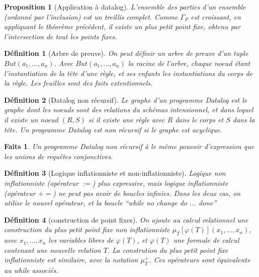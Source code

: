 \documentclass[landscape]{article}
\newcommand{\1}{\mathbbm{1}}
\newcommand{\0}{\mathbbm{0}}
\renewcommand{\phi}{\varphi}
\newtheorem{prop}{Proposition}
\newtheorem{defi}{Définition}
\newtheorem{fact}{Faits}
\begin{document}
\begin{multicols}{2}
    \begin{prop}[Application à datalog]
      L'ensemble des parties d'un ensemble (ordonné par l'inclusion) est un
      treillis complet. Comme $\Gamma_P$ est croissant, en appliquant le
      théorème précédent, il existe un plus petit point fixe, obtenu par
      l'intersection de tout les points fixes.
    \end{prop}

    \begin{defi}[Arbre de preuve]
      On peut définir un arbre de preuve d'un tuple $But(a_1,...,a_n)$. Avec
      $But(a_1,...,a_n)$ la racine de l'arbre, chaque noeud étant
      l'instantiation de la tête d'une règle, et ses enfants les instantiations
      du corps de la règle. Les feuilles sont des faits extentionnels.
    \end{defi}

    \begin{defi}[Datalog non récursif]
      Le graphe d'un programme Datalog est le graphe dont les noeuds sont des
      relations du schémas intensionnel, et dans lequel il existe un noeud
      $(R,S)$ si il existe une règle avec $R$ dans le corps et $S$ dans la tête.
      Un programme Datalog est non récursif si le graphe est acyclique.
    \end{defi}

    \begin{fact}
      Un programme Datalog non récursif à le même pouvoir d'expression que les
      unions de requêtes conjonctives.
    \end{fact}

    \begin{defi}[Logique inflationniste et non-inflationniste]
      Logique non inflationniste (opérateur $:=$) plus expressive, mais logique
      inflationniste (opérateur $+=$) ne peut pas avoir de boucles infinies.
      Dans les deux cas, on utilise le nouvel opérateur, et la boucle ``while no
      change do ... done''
    \end{defi}

    \begin{defi}[construction de point fixes]
      On ajoute au calcul relationnel une construction du plus petit point fixe
      non inflationniste
      $\mu_T[\phi(T)](x_1,...,x_n)$, avec $x_1,...,x_n$ les variables libres de
      $\phi(T)$, et $\phi(T)$ une formule de calcul contenant une nouvelle
      relation $T$. La constrution du plus petit point fixe inflationniste est
      similaire, avec la notation $\mu^+_T$. Ces opérateurs sont équivalents au
      while associés.
    \end{defi}


\end{multicols}
\end{document}
